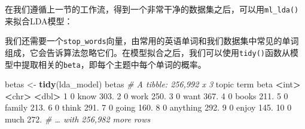 \documentclass[
]{article}
\newenvironment{Shaded}{\begin{snugshade}}{\end{snugshade}}
\newcommand{\CommentTok}[1]{\textcolor[rgb]{0.56,0.35,0.01}{\textit{#1}}}
\newcommand{\DataTypeTok}[1]{\textcolor[rgb]{0.13,0.29,0.53}{#1}}
\newcommand{\DecValTok}[1]{\textcolor[rgb]{0.00,0.00,0.81}{#1}}
\newcommand{\ErrorTok}[1]{\textcolor[rgb]{0.64,0.00,0.00}{\textbf{#1}}}
\newcommand{\FloatTok}[1]{\textcolor[rgb]{0.00,0.00,0.81}{#1}}
\newcommand{\KeywordTok}[1]{\textcolor[rgb]{0.13,0.29,0.53}{\textbf{#1}}}
\newcommand{\NormalTok}[1]{#1}
\newcommand{\OperatorTok}[1]{\textcolor[rgb]{0.81,0.36,0.00}{\textbf{#1}}}
\newcommand{\StringTok}[1]{\textcolor[rgb]{0.31,0.60,0.02}{#1}}
\begin{document}
在我们遵循上一节的工作流，得到一个非常干净的数据集之后，可以用\texttt{ml\_lda()}来拟合LDA模型：

\begin{Shaded}
\end{Shaded}

我们还需要一个\texttt{stop\_words}向量，由常用的英语单词和我们数据集中常见的单词组成，它会告诉算法忽略它们。在模型拟合之后，我们可以使用\texttt{tidy()}函数从模型中提取相关的\texttt{beta}，即每个主题中每个单词的概率。

\begin{Shaded}
\begin{Highlighting}[]
\NormalTok{betas <-}\StringTok{ }\KeywordTok{tidy}\NormalTok{(lda_model)}
\NormalTok{betas}
\CommentTok{# A tibble: 256,992 x 3}
\NormalTok{ topic term beta}
 \OperatorTok{<}\NormalTok{int}\OperatorTok{>}\StringTok{ }\ErrorTok{<}\NormalTok{chr}\OperatorTok{>}\StringTok{ }\ErrorTok{<}\NormalTok{dbl}\OperatorTok{>}
\StringTok{ }\DecValTok{1} \DecValTok{0}\NormalTok{ know }\FloatTok{303.}
 \DecValTok{2} \DecValTok{0}\NormalTok{ work }\FloatTok{250.}
 \DecValTok{3} \DecValTok{0}\NormalTok{ want }\FloatTok{367.}
 \DecValTok{4} \DecValTok{0}\NormalTok{ books }\FloatTok{211.}
 \DecValTok{5} \DecValTok{0}\NormalTok{ family }\FloatTok{213.}
 \DecValTok{6} \DecValTok{0}\NormalTok{ think }\FloatTok{291.}
 \DecValTok{7} \DecValTok{0}\NormalTok{ going }\FloatTok{160.}
 \DecValTok{8} \DecValTok{0}\NormalTok{ anything }\FloatTok{292.}
 \DecValTok{9} \DecValTok{0}\NormalTok{ enjoy }\FloatTok{145.}
\DecValTok{10} \DecValTok{0}\NormalTok{ much }\FloatTok{272.}
\CommentTok{# … with 256,982 more rows}
\end{Highlighting}
\end{Shaded}
\end{document}
